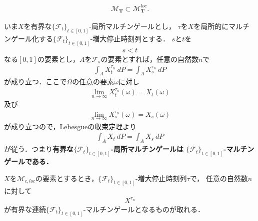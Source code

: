 	\begin{screen}
		\begin{thm}[マルチンゲールは局所マルチンゲール]
			\begin{align}
				\mathscr{M}_{\mathbf{T}} \subset \mathscr{M}^{loc}_{\mathbf{T}}.
			\end{align}
		\end{thm}
	\end{screen}
	
	\begin{sketch}
		
	\end{sketch}
	
	いま$X$を有界な$\{\mathscr{F}_{t}\}_{t \in [0,1]}$-局所マルチンゲールとし，
	$\tau$を$X$を局所的にマルチンゲール化する$\{\mathscr{F}_{t}\}_{t \in [0,1]}$-増大停止時刻列とする．
	$s$と$t$を
	\begin{align}
		s < t
	\end{align}
	なる$[0,1]$の要素とし，$A$を$\mathscr{F}_{s}$の要素とすれば，任意の自然数$n$で
	\begin{align}
		\int_{A} X^{\tau_{n}}_{t}\ dP = \int_{A} X^{\tau_{n}}_{s}\ dP
	\end{align}
	が成り立つ．ここで$\Omega$の任意の要素$\omega$に対し
	\begin{align}
		\lim_{n \to \infty} X^{\tau_{n}}_{t}(\omega) = X_{t}(\omega)
	\end{align}
	及び
	\begin{align}
		\lim_{n \to \infty} X^{\tau_{n}}_{s}(\omega) = X_{s}(\omega)
	\end{align}
	が成り立つので，Lebesgueの収束定理より
	\begin{align}
		\int_{A} X_{t}\ dP = \int_{A} X_{s}\ dP
	\end{align}
	が従う．つまり{\bf 有界な$\{\mathscr{F}_{t}\}_{t \in [0,1]}$-局所マルチンゲールは
	$\{\mathscr{F}_{t}\}_{t \in [0,1]}$-マルチンゲールである．}
	
	\begin{screen}
		\begin{thm}
			$X$を$\mathscr{M}_{c,loc}$の要素とするとき，$\{\mathscr{F}_{t}\}_{t \in [0,1]}$-増大停止時刻列$\tau$で，
			任意の自然数$n$に対して
			\begin{align}
				X^{\tau_{n}}
			\end{align}
			が有界な連続$\{\mathscr{F}_{t}\}_{t \in [0,1]}$-マルチンゲールとなるものが取れる．
		\end{thm}
	\end{screen}
	
